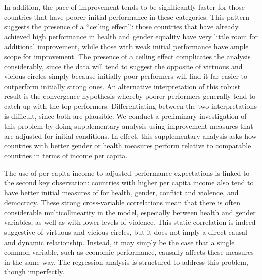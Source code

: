 \documentclass[12pt]{article}
\begin{document}
In addition, the pace of improvement tends to be significantly faster for those countries that have poorer initial performance in these categories. This pattern suggests the presence of a \enquote{ceiling effect}: those countries that have already achieved high performance in health and gender equality have very little room for additional improvement, while those with weak initial performance have ample scope for improvement. The presence of a ceiling effect complicates the analysis considerably, since the data will tend to suggest the opposite of virtuous and vicious circles simply because initially poor performers will find it far easier to outperform initially strong ones. An alternative interpretation of this robust result is the convergence hypothesis whereby poorer performers generally tend to catch up with the top performers. Differentiating between the two interpretations is difficult, since both are plausible. We conduct a preliminary investigation of this problem by doing supplementary analysis using improvement measures that are adjusted for initial conditions. In effect, this supplementary analysis asks how countries with better gender or health measures perform relative to comparable countries in terms of income per capita.

The use of per capita income to adjusted performance expectations is linked to the second key observation: countries with higher per capita income also tend to have better initial measures of for health, gender, conflict and violence, and democracy. These strong cross-variable correlations mean that there is often considerable multicollinearity in the model, especially between health and gender variables, as well as with lower levels of violence. This static correlation is indeed suggestive of virtuous and vicious circles, but it does not imply a direct causal and dynamic relationship. Instead, it may simply be the case that a single common variable, such as economic performance, causally affects these measures in the same way. The regression analysis is structured to address this problem, though imperfectly.
\end{document}
